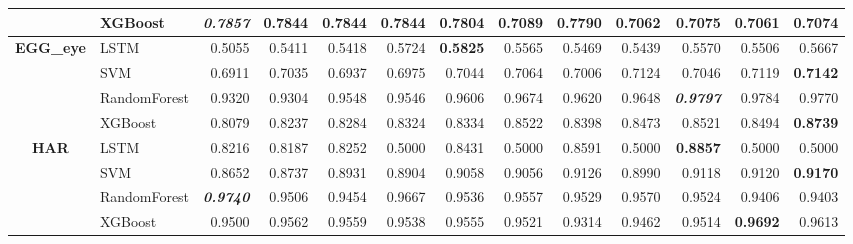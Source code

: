 \begin{table}[H]
\begin{adjustbox}{max width=14cm}
\begin{tabular}{|c|l|r|r|r|r|r|r|r|r|r|r|r|}
			                      & XGBoost      & \textit{\textbf{0.7857}} & 0.7844          & 0.7844                   & 0.7844                   & 0.7804          & 0.7089                   & 0.7790 & 0.7062 & 0.7075                   & 0.7061          & 0.7074          \\
			\hline
			\textbf{EGG\_eye}     & LSTM         & 0.5055                   & 0.5411          & 0.5418                   & 0.5724                   & \textbf{0.5825} & 0.5565                   & 0.5469 & 0.5439 & 0.5570                   & 0.5506          & 0.5667          \\
			                      & SVM          & 0.6911                   & 0.7035          & 0.6937                   & 0.6975                   & 0.7044          & 0.7064                   & 0.7006 & 0.7124 & 0.7046                   & 0.7119          & \textbf{0.7142} \\
			                      & RandomForest & 0.9320                   & 0.9304          & 0.9548                   & 0.9546                   & 0.9606          & 0.9674                   & 0.9620 & 0.9648 & \textit{\textbf{0.9797}} & 0.9784          & 0.9770          \\
			                      & XGBoost      & 0.8079                   & 0.8237          & 0.8284                   & 0.8324                   & 0.8334          & 0.8522                   & 0.8398 & 0.8473 & 0.8521                   & 0.8494          & \textbf{0.8739} \\
			\hline
			\textbf{HAR}          & LSTM         & 0.8216                   & 0.8187          & 0.8252                   & 0.5000                   & 0.8431          & 0.5000                   & 0.8591 & 0.5000 & \textbf{0.8857}          & 0.5000          & 0.5000          \\
			                      & SVM          & 0.8652                   & 0.8737          & 0.8931                   & 0.8904                   & 0.9058          & 0.9056                   & 0.9126 & 0.8990 & 0.9118                   & 0.9120          & \textbf{0.9170} \\
			                      & RandomForest & \textit{\textbf{0.9740}} & 0.9506          & 0.9454                   & 0.9667                   & 0.9536          & 0.9557                   & 0.9529 & 0.9570 & 0.9524                   & 0.9406          & 0.9403          \\
			                      & XGBoost      & 0.9500                   & 0.9562          & 0.9559                   & 0.9538                   & 0.9555          & 0.9521                   & 0.9314 & 0.9462 & 0.9514                   & \textbf{0.9692} & 0.9613          \\

\end{tabular}
\end{adjustbox}
\end{table}
